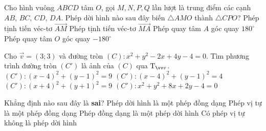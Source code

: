 \begin{ex}%
	Cho hình vuông $ABCD$ tâm $O$, gọi $M, N, P, Q$ lần lượt là trung điểm các cạnh $AB$, $BC$, $CD$, $DA$. 
	Phép dời hình nào sau đây biến $\triangle AMO$  thành $\triangle CPO$?
	\choice
	{Phép tịnh tiến véc-tơ $\vec{AM}$}
	{Phép tịnh tiến véc-tơ $\vec{MA}$}
	{Phép quay tâm $A$ góc quay $180^\circ$}
	{\True Phép quay tâm $O$ góc quay $-180^\circ$}
\end{ex}

\begin{ex}%
	Cho $\vec{v}=(3;3)$ và đường tròn $(C): x^2+y^2-2x+4y-4=0$. Tìm phương trình đường tròn $(C')$ là ảnh của $(C)$ qua ${\rm T}_{\vec{v}}$.
	\choice
	{\True $(C'): (x-4)^2+(y-1)^2=9$}
	{$(C'): (x-4)^2+(y-1)^2=4$}
	{$(C'): (x+4)^2+(y+1)^2=9$}
	{$(C'): x^2+y^2+8x+2y-4=0$}
\end{ex}

\begin{ex}%
	Khẳng định nào sau đây là \textbf{sai}?
	\choice
	{Phép dời hình là một phép đồng dạng}
	{Phép vị tự là một phép đồng dạng}
	{\True Phép đồng dạng là một phép dời hình}
	{Có phép vị tự không là phép dời hình}
\end{ex}

